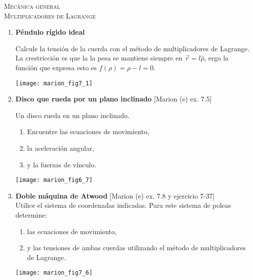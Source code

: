 \documentclass[11pt,spanish,a4paper]{article}
\begin{document}
\begin{center}
  \textsc{\large Mecánica general}\\
  \textsc{\large Multiplicadores de Lagrange}
\end{center}

\begin{enumerate}


	
\item \textbf{Péndulo rígido ideal}\\
\begin{minipage}[t][1.5cm]{0.85\textwidth}
Calcule la tensión de la cuerda con el método de multiplicadores de Lagrange.
La crestricción es que la la pesa se mantiene siempre en \(\vec{r} = l \hat{\rho}\), ergo la función que expresa esto es \(f(\rho) = \rho - l = 0\).
\end{minipage}
\begin{minipage}[c][3cm][t]{0.1\textwidth}
	\texttt{[image: marion\_fig7\_1]}
\end{minipage}



\item \textbf{Disco que rueda por un plano inclinado} [Marion (e) ex. 7.5]\\
\begin{minipage}[t][3.5cm]{0.7\textwidth}
	Un disco rueda en un plano inclinado.
	\begin{enumerate}
		\item Encuentre las ecuaciones de movimiento, 
		\item la aceleración angular,
		\item y la fuerzas de vínculo. 
	\end{enumerate}
\end{minipage}
\begin{minipage}[c][2cm][t]{0.25\textwidth}
	\texttt{[image: marion\_fig6\_7]}
\end{minipage}


	
\item
\begin{minipage}[t][5.5cm]{0.6\textwidth}
\textbf{Doble máquina de Atwood} [Marion (e) ex. 7.8 y ejercicio 7-37]\\
Utilice el sistema de coordenadas indicadas.
Para este sistema de poleas determine: 
\begin{enumerate}
	\item las ecuaciones de movimiento,
	\item y las tensiones de ambas cuerdas utilizando el método de multiplicadores de Lagrange.
\end{enumerate}
\end{minipage}
\begin{minipage}[c][4cm][t]{0.35\textwidth}
	\texttt{[image: marion\_fig7\_6]}
\end{minipage}




\end{enumerate}
\end{document}
